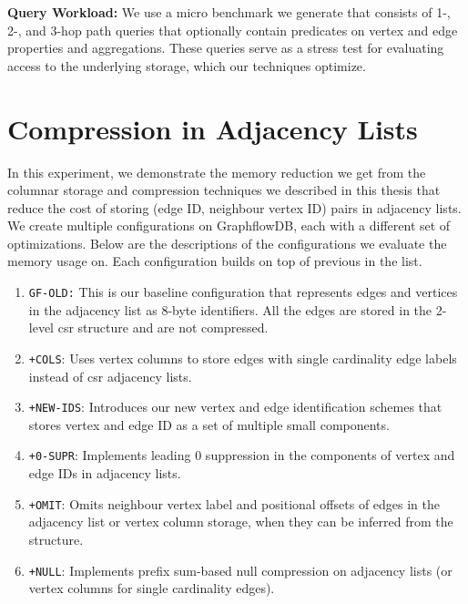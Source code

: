 \noindent \textbf{Query Workload:} We use a micro benchmark we generate that consists of 1-, 2-, and 3-hop path queries that optionally contain predicates on vertex and edge properties and aggregations. These queries serve as a stress test for evaluating access to the underlying storage, which our techniques optimize. 

\section{Compression in Adjacency Lists}
\label{exp:adjacency-list-exp}

In this experiment, we demonstrate the memory reduction we get from the columnar storage and compression techniques we described in this thesis that reduce the cost of storing (edge ID, neighbour vertex ID) pairs in adjacency lists.%
We create multiple configurations on GraphflowDB, each with a different set of optimizations. Below are the descriptions of the configurations we evaluate the memory usage on. Each configuration builds on top of previous in the list. 

\begin{enumerate}
	
	\item \texttt{GF-OLD:} This is our baseline configuration that represents edges and vertices in the adjacency list as 8-byte identifiers. All the edges are stored in the 2-level \gls{csr} structure and are not compressed.
	
	\item \texttt{+COLS}: Uses vertex columns to store edges with single cardinality edge labels instead of \gls{csr} adjacency lists. 
	
	\item \texttt{+NEW-IDS}: Introduces our new vertex and edge identification schemes that stores vertex and edge ID as a set of multiple small components.
	
	\item \texttt{+0-SUPR}: Implements leading 0 suppression in the components of vertex and edge IDs in adjacency lists.
	
	\item \texttt{+OMIT}: Omits neighbour vertex label and positional offsets of edges in the adjacency list or vertex column storage, when they can be inferred from the structure.
	
	\item \texttt{+NULL}: Implements prefix sum-based null compression on adjacency lists (or vertex columns for single cardinality edges).
	
\end{enumerate}

